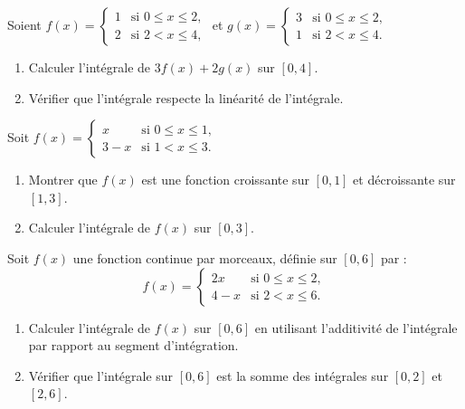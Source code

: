 \begin{exercice}
Soient \( f(x) = \begin{cases} 
1 & \text{si } 0 \leq x \leq 2, \\
2 & \text{si } 2 < x \leq 4, 
\end{cases} \)
et \( g(x) = \begin{cases} 
3 & \text{si } 0 \leq x \leq 2, \\
1 & \text{si } 2 < x \leq 4.
\end{cases} \)
\begin{enumerate}
    \item Calculer l'intégrale de \( 3f(x) + 2g(x) \) sur \( [0, 4] \).
    \item Vérifier que l'intégrale respecte la linéarité de l'intégrale.
\end{enumerate}
\end{exercice}

\begin{exercice}
Soit \( f(x) = \begin{cases}
x & \text{si } 0 \leq x \leq 1, \\
3-x & \text{si } 1 < x \leq 3.
\end{cases} \)
\begin{enumerate}
    \item Montrer que \( f(x) \) est une fonction croissante sur \( [0, 1] \) et décroissante sur \( [1, 3] \).
    \item Calculer l'intégrale de \( f(x) \) sur \( [0, 3] \).
\end{enumerate}
\end{exercice}

\begin{exercice}
Soit \( f(x) \) une fonction continue par morceaux, définie sur \( [0, 6] \) par :
\[
f(x) = \begin{cases}
2x & \text{si } 0 \leq x \leq 2, \\
4 - x & \text{si } 2 < x \leq 6.
\end{cases}
\]
\begin{enumerate}
    \item Calculer l'intégrale de \( f(x) \) sur \( [0, 6] \) en utilisant l'additivité de l'intégrale par rapport au segment d'intégration.
    \item Vérifier que l'intégrale sur \( [0, 6] \) est la somme des intégrales sur \( [0, 2] \) et \( [2, 6] \).
\end{enumerate}
\end{exercice}

